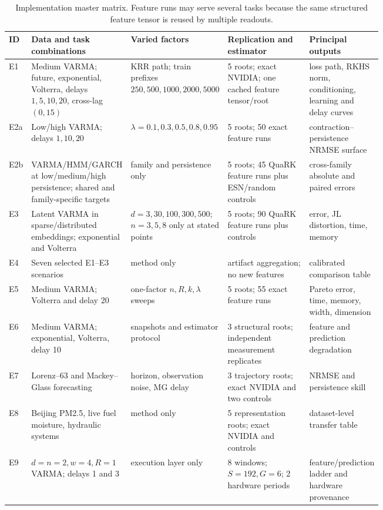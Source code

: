 \begin{table}[H]
\centering
\scriptsize
\caption{Implementation master matrix.  Feature runs may serve several tasks
because the same structured feature tensor is reused by multiple readouts.}
\label{tab:master-matrix}
\begin{tabularx}{\linewidth}{@{}p{0.055\linewidth}p{0.22\linewidth}p{0.25\linewidth}p{0.22\linewidth}X@{}}
\toprule
ID & Data and task combinations & Varied factors & Replication and estimator & Principal outputs \\
\midrule
E1 & Medium VARMA; future, exponential, Volterra, delays \(1,5,10,20\), cross-lag \((0,15)\) & KRR path; train prefixes \(250,500,1000,2000,5000\) & 5 roots; exact NVIDIA; one cached feature tensor/root & loss path, RKHS norm, conditioning, learning and delay curves \\
E2a & Low/high VARMA; delays \(1,10,20\) & \(\lambda=0.1,0.3,0.5,0.8,0.95\) & 5 roots; 50 exact feature runs & contraction--persistence NRMSE surface \\
E2b & VARMA/HMM/GARCH at low/medium/high persistence; shared and family-specific targets & family and persistence only & 5 roots; 45 QuaRK feature runs plus ESN/random controls & cross-family absolute and paired errors \\
E3 & Latent VARMA in sparse/distributed embeddings; exponential and Volterra & \(d=3,30,100,300,500\); \(n=3,5,8\) only at stated points & 5 roots; 90 QuaRK feature runs plus controls & error, JL distortion, time, memory \\
E4 & Seven selected E1--E3 scenarios & method only & artifact aggregation; no new features & calibrated comparison table \\
E5 & Medium VARMA; Volterra and delay 20 & one-factor \(n,R,k,\lambda\) sweeps & 5 roots; 55 exact feature runs & Pareto error, time, memory, width, dimension \\
E6 & Medium VARMA; exponential, Volterra, delay 10 & snapshots and estimator protocol & 3 structural roots; independent measurement replicates & feature and prediction degradation \\
E7 & Lorenz--63 and Mackey--Glass forecasting & horizon, observation noise, MG delay & 3 trajectory roots; exact NVIDIA and two controls & NRMSE and persistence skill \\
E8 & Beijing PM2.5, live fuel moisture, hydraulic systems & method only & 5 representation roots; exact NVIDIA and controls & dataset-level transfer table \\
E9 & \(d=n=2,w=4,R=1\) VARMA; delays 1 and 3 & execution layer only & 8 windows; \(S=192,G=6\); 2 hardware periods & feature/prediction ladder and hardware provenance \\
\bottomrule
\end{tabularx}
\end{table}

